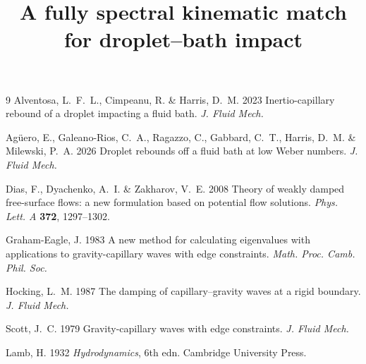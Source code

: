 \documentclass[11pt]{article}
\title{A fully spectral kinematic match for droplet--bath impact}
\author{}
\date{}
\begin{document}
\maketitle



\begin{thebibliography}{9}
Alventosa, L.~F.~L., Cimpeanu, R. \& Harris, D.~M. 2023
Inertio-capillary rebound of a droplet impacting a fluid bath.
\textit{J. Fluid Mech.}

Ag\"uero, E., Galeano-Rios, C.~A., Ragazzo, C., Gabbard, C.~T., Harris, D.~M. \& Milewski, P.~A. 2026
Droplet rebounds off a fluid bath at low Weber numbers.
\textit{J. Fluid Mech.}

Dias, F., Dyachenko, A.~I. \& Zakharov, V.~E. 2008
Theory of weakly damped free-surface flows: a new formulation based on potential flow solutions.
\textit{Phys. Lett. A} \textbf{372}, 1297--1302.

Graham-Eagle, J. 1983
A new method for calculating eigenvalues with applications to gravity-capillary waves with edge constraints.
\textit{Math. Proc. Camb. Phil. Soc.}

Hocking, L.~M. 1987
The damping of capillary--gravity waves at a rigid boundary.
\textit{J. Fluid Mech.}

Scott, J.~C. 1979
Gravity-capillary waves with edge constraints.
\textit{J. Fluid Mech.}

Lamb, H. 1932
\textit{Hydrodynamics}, 6th edn. Cambridge University Press.
\end{thebibliography}
\end{document}
